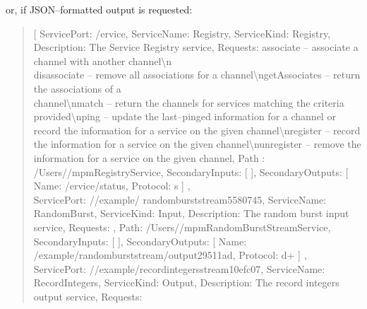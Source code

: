 or, if JSON--formatted output is requested:
\begin{quote}
[ \textbraceleft{} \dquote{}ServicePort\dquote{}: \dquote{}/\textdollar{}ervice\dquote{},
\dquote{}ServiceName\dquote{}: \dquote{}Registry\dquote{}, \dquote{}ServiceKind\dquote{}:
\dquote{}Registry\dquote{}, \dquote{}Description\dquote{}: \dquote{}The Service Registry
service\dquote{}, \dquote{}Requests\dquote{}: \dquote{}associate -- associate a channel
with another channel\textbackslash{}n\\
disassociate -- remove all associations for a channel\textbackslash{}ngetAssociates --
return the associations of a\\
channel\textbackslash{}nmatch -- return the channels for services matching the criteria
provided\textbackslash{}nping -- update the last--pinged information for a channel or
record the information for a service on the given channel\textbackslash{}nregister --
record the information for a service on the given channel\textbackslash{}nunregister --
remove the information for a service on the given channel\dquote{}, \dquote{}Path%
\dquote{}: \dquote{}/Users/\textellipsis{}/mpmRegistryService\dquote{}, \dquote{}%
SecondaryInputs\dquote{}: [  ], \dquote{}SecondaryOutputs\dquote{}:
[ \textbraceleft{} \dquote{}Name\dquote{}: \dquote{}/\textdollar{}ervice/status\dquote{},
\dquote{}Protocol\dquote{}: \dquote{}s\dquote{} \textbraceright{} ] \textbraceright{},\\
\textbraceleft{} \dquote{}ServicePort\dquote{}: \dquote{}/\serviceName/example/%
randomburststream\textunderscore{}5580745\dquote{}, \dquote{}ServiceName\dquote{}:
\dquote{}RandomBurst\dquote{}, \dquote{}ServiceKind\dquote{}: \dquote{}Input\dquote{},
\dquote{}Description\dquote{}: \dquote{}The random burst input service\dquote{},
\dquote{}Requests\dquote{}: \dquote{}\dquote{}, \dquote{}Path\dquote{}:
\dquote{}/Users/\textellipsis{}/mpmRandomBurstStreamService\dquote{},
\dquote{}SecondaryInputs\dquote{}: [  ], \dquote{}SecondaryOutputs\dquote{}: [
\textbraceleft{} \dquote{}Name\dquote{}: \dquote{}%
/example/randomburststream/output\textunderscore{}29511ad\dquote{},
\dquote{}Protocol\dquote{}: \dquote{}d+\dquote{} \textbraceright{} ] \textbraceright{},\\
\textbraceleft{} \dquote{}ServicePort\dquote{}:
\dquote{}/\serviceName/example/recordintegersstream\textunderscore{}10efc07\dquote{},
\dquote{}ServiceName\dquote{}: \dquote{}RecordIntegers\dquote{},
\dquote{}ServiceKind\dquote{}: \dquote{}Output\dquote{}, \dquote{}Description\dquote{}:
\dquote{}The record integers output service\dquote{}, \dquote{}Requests\dquote{}:

\end{quote}

